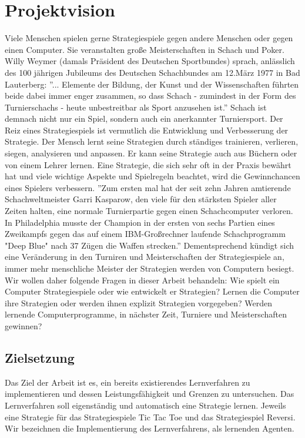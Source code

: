 \chapter{Projektvision}
\label{cha:projektvision}

Viele Menschen spielen gerne Strategiespiele gegen andere Menschen oder gegen einen Computer. Sie veranstalten große Meisterschaften in Schach und Poker. Willy Weymer (damals Präsident des Deutschen Sportbundes) sprach, anlässlich des 100 jährigen Jubileums des Deutschen Schachbundes am 12.März 1977 in Bad Lauterberg: ''... Elemente der Bildung, der Kunst und der Wissenschaften führten beide dabei immer enger zusammen, so dass Schach - zumindest in der Form des Turnierschachs - heute unbestreitbar als Sport anzusehen ist.'' Schach ist demnach nicht nur ein Spiel, sondern auch ein anerkannter Turniersport. Der Reiz eines Strategiespiels ist vermutlich die Entwicklung und Verbesserung der Strategie. Der Mensch lernt seine Strategien durch ständiges trainieren, verlieren, siegen, analysieren und anpassen. Er kann seine Strategie auch aus Büchern oder von einem Lehrer lernen. Eine Strategie, die sich sehr oft in der Praxis bewährt hat und viele wichtige Aspekte und Spielregeln beachtet, wird die Gewinnchancen eines Spielers verbessern. ''Zum ersten mal hat der seit zehn Jahren amtierende Schachweltmeister Garri Kasparow, den viele für den stärksten Spieler aller Zeiten halten, eine normale Turnierpartie gegen einen Schachcomputer verloren. In Philadelphia musste der Champion in der ersten von sechs Partien eines Zweikampfs gegen das auf einem IBM-Großrechner laufende Schachprogramm "Deep Blue" nach 37 Zügen die Waffen strecken.'' Dementsprechend kündigt sich eine Veränderung in den Turniren und Meisterschaften der Strategiespiele an, immer mehr menschliche Meister der Strategien werden von Computern besiegt. Wir wollen daher folgende Fragen in dieser Arbeit behandeln: Wie spielt ein Computer Strategiespiele oder wie entwickelt er Strategien? Lernen die Computer ihre Strategien oder werden ihnen explizit Strategien vorgegeben? Werden lernende Computerprogramme, in nächster Zeit, Turniere und Meisterschaften gewinnen? 

\section{Zielsetzung}
Das Ziel der Arbeit ist es, ein bereits existierendes Lernverfahren zu implementieren und dessen Leistungsfähigkeit und Grenzen zu untersuchen. Das Lernverfahren soll eigenständig und automatisch eine Strategie lernen. Jeweils eine Strategie für das Strategiespiele Tic Tac Toe und das Strategiespiel Reversi. Wir bezeichnen die Implementierung des Lernverfahrens, als lernenden Agenten.\\  

